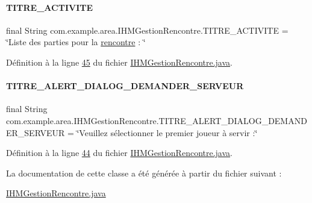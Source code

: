 \paragraph{\texorpdfstring{T\+I\+T\+R\+E\+\_\+\+A\+C\+T\+I\+V\+I\+TE}{TITRE\_ACTIVITE}}
{\footnotesize\ttfamily final String com.\+example.\+area.\+I\+H\+M\+Gestion\+Rencontre.\+T\+I\+T\+R\+E\+\_\+\+A\+C\+T\+I\+V\+I\+TE = \char`\"{}Liste des parties pour la \hyperlink{classcom_1_1example_1_1area_1_1_i_h_m_gestion_rencontre_aa3ecacbd8ab104d2a3c3f3e727ae6c5c}{rencontre} \+: \char`\"{}\hspace{0.3cm}{\ttfamily [static]}}



Définition à la ligne \hyperlink{_i_h_m_gestion_rencontre_8java_source_l00045}{45} du fichier \hyperlink{_i_h_m_gestion_rencontre_8java_source}{I\+H\+M\+Gestion\+Rencontre.\+java}.

\mbox{\label{classcom_1_1example_1_1area_1_1_i_h_m_gestion_rencontre_a31b8b293d8e0aa02050fddf9891349f2}} 
\paragraph{\texorpdfstring{T\+I\+T\+R\+E\+\_\+\+A\+L\+E\+R\+T\+\_\+\+D\+I\+A\+L\+O\+G\+\_\+\+D\+E\+M\+A\+N\+D\+E\+R\+\_\+\+S\+E\+R\+V\+E\+UR}{TITRE\_ALERT\_DIALOG\_DEMANDER\_SERVEUR}}
{\footnotesize\ttfamily final String com.\+example.\+area.\+I\+H\+M\+Gestion\+Rencontre.\+T\+I\+T\+R\+E\+\_\+\+A\+L\+E\+R\+T\+\_\+\+D\+I\+A\+L\+O\+G\+\_\+\+D\+E\+M\+A\+N\+D\+E\+R\+\_\+\+S\+E\+R\+V\+E\+UR = \char`\"{}Veuillez sélectionner le premier joueur à servir \+:\char`\"{}\hspace{0.3cm}{\ttfamily [static]}}



Définition à la ligne \hyperlink{_i_h_m_gestion_rencontre_8java_source_l00044}{44} du fichier \hyperlink{_i_h_m_gestion_rencontre_8java_source}{I\+H\+M\+Gestion\+Rencontre.\+java}.



La documentation de cette classe a été générée à partir du fichier suivant \+:\begin{DoxyCompactItemize}
\item 
\hyperlink{_i_h_m_gestion_rencontre_8java}{I\+H\+M\+Gestion\+Rencontre.\+java}\end{DoxyCompactItemize}
